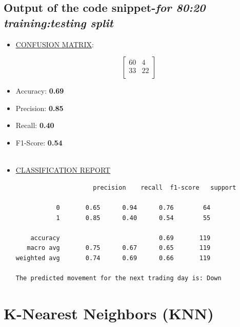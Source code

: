 \documentclass[12pt,a4paper]{report}
\begin{document}
\section{Output of the code snippet-\textit{for 80:20 training:testing split}}
\begin{itemize}
    \item \underline{CONFUSION MATRIX}:
    \vspace{-0.5cm}
    \begin{flushleft}
    \[
    \begin{bmatrix}
        60 & 4 \\
        33 & 22 \\
    \end{bmatrix}
    \]
    \end{flushleft}
    \vspace{-0.5cm} %

    \item Accuracy: \textbf{0.69}
    \item Precision: \textbf{0.85}
    \item Recall: \textbf{0.40}
    \item F1-Score: \textbf{0.54}
\\
\\
    \item \underline{CLASSIFICATION REPORT}
\begin{verbatim}
                     precision    recall  f1-score   support

           0       0.65      0.94      0.76        64
           1       0.85      0.40      0.54        55

    accuracy                           0.69       119
   macro avg       0.75      0.67      0.65       119
weighted avg       0.74      0.69      0.66       119

The predicted movement for the next trading day is: Down
\end{verbatim}
\end{itemize}


\chapter{K-Nearest Neighbors (KNN)}
\end{document}
